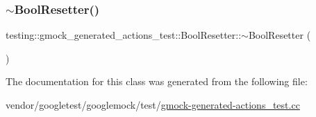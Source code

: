 \mbox{\label{classtesting_1_1gmock__generated__actions__test_1_1_bool_resetter_a814afb883394b0fe7d7c8c1aa22d9cb6}} 
\subsubsection{\texorpdfstring{$\sim$\+Bool\+Resetter()}{~BoolResetter()}}
{\footnotesize\ttfamily testing\+::gmock\+\_\+generated\+\_\+actions\+\_\+test\+::\+Bool\+Resetter\+::$\sim$\+Bool\+Resetter (\begin{DoxyParamCaption}{ }\end{DoxyParamCaption})\hspace{0.3cm}{\ttfamily [inline]}}



The documentation for this class was generated from the following file\+:\begin{DoxyCompactItemize}
\item 
vendor/googletest/googlemock/test/\hyperlink{gmock-generated-actions__test_8cc}{gmock-\/generated-\/actions\+\_\+test.\+cc}\end{DoxyCompactItemize}
